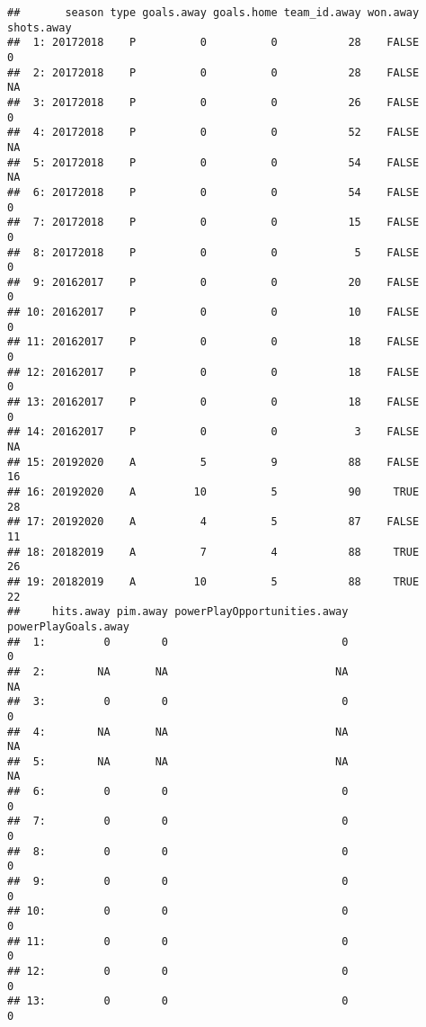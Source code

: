 \documentclass[
]{article}
\begin{document}
\begin{verbatim}
##       season type goals.away goals.home team_id.away won.away shots.away
##  1: 20172018    P          0          0           28    FALSE          0
##  2: 20172018    P          0          0           28    FALSE         NA
##  3: 20172018    P          0          0           26    FALSE          0
##  4: 20172018    P          0          0           52    FALSE         NA
##  5: 20172018    P          0          0           54    FALSE         NA
##  6: 20172018    P          0          0           54    FALSE          0
##  7: 20172018    P          0          0           15    FALSE          0
##  8: 20172018    P          0          0            5    FALSE          0
##  9: 20162017    P          0          0           20    FALSE          0
## 10: 20162017    P          0          0           10    FALSE          0
## 11: 20162017    P          0          0           18    FALSE          0
## 12: 20162017    P          0          0           18    FALSE          0
## 13: 20162017    P          0          0           18    FALSE          0
## 14: 20162017    P          0          0            3    FALSE         NA
## 15: 20192020    A          5          9           88    FALSE         16
## 16: 20192020    A         10          5           90     TRUE         28
## 17: 20192020    A          4          5           87    FALSE         11
## 18: 20182019    A          7          4           88     TRUE         26
## 19: 20182019    A         10          5           88     TRUE         22
##     hits.away pim.away powerPlayOpportunities.away powerPlayGoals.away
##  1:         0        0                           0                   0
##  2:        NA       NA                          NA                  NA
##  3:         0        0                           0                   0
##  4:        NA       NA                          NA                  NA
##  5:        NA       NA                          NA                  NA
##  6:         0        0                           0                   0
##  7:         0        0                           0                   0
##  8:         0        0                           0                   0
##  9:         0        0                           0                   0
## 10:         0        0                           0                   0
## 11:         0        0                           0                   0
## 12:         0        0                           0                   0
## 13:         0        0                           0                   0

\end{verbatim}
\end{document}
